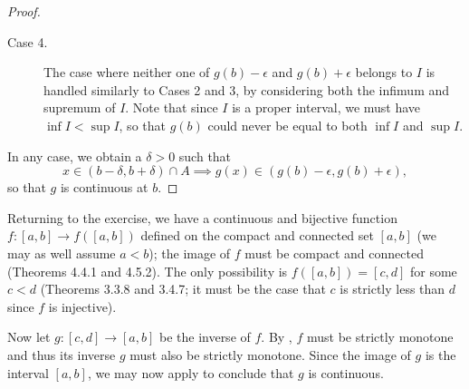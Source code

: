 \documentclass{lew98_solutions}
\begin{document}
\begin{solution}
\begin{proof}
\begin{description}
            \item[Case 4.] The case where neither one of \( g(b) - \epsilon \) and \( g(b) + \epsilon \) belongs to \( I \) is handled similarly to Cases 2 and 3, by considering both the infimum and supremum of \( I \). Note that since \( I \) is a proper interval, we must have \( \inf I < \sup I \), so that \( g(b) \) could never be equal to both \( \inf I \) and \( \sup I \).
        \end{description}

        In any case, we obtain a \( \delta > 0 \) such that
        \[
            x \in (b - \delta, b + \delta) \cap A \implies g(x) \in (g(b) - \epsilon, g(b) + \epsilon),
        \]
        so that \( g \) is continuous at \( b \).
    \end{proof}

    Returning to the exercise, we have a continuous and bijective function \( f : [a, b] \to f([a, b]) \) defined on the compact and connected set \( [a, b] \) (we may as well assume \( a < b \)); the image of \( f \) must be compact and connected (Theorems 4.4.1 and 4.5.2). The only possibility is \( f([a, b]) = [c, d] \) for some \( c < d \) (Theorems 3.3.8 and 3.4.7; it must be the case that \( c \) is strictly less than \( d \) since \( f \) is injective).

    Now let \( g : [c, d] \to [a, b] \) be the inverse of \( f \). By , \( f \) must be strictly monotone and thus its inverse \( g \) must also be strictly monotone. Since the image of \( g \) is the interval \( [a, b] \), we may now apply  to conclude that \( g \) is continuous.
\end{solution}
\end{document}
